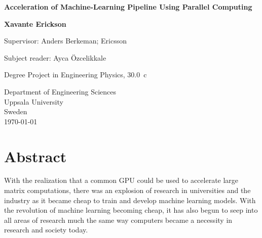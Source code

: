 \documentclass[12pt, a4paper]{article}
\title{}
\author{Lowe Erickson }
\date{May 2018}
\begin{document}
\begin{titlepage}
   \begin{center}
        \vspace*{1cm}
        \Huge
        \textbf{Acceleration of
        Machine-Learning Pipeline Using Parallel Computing}
 
        \LARGE
        \vspace{1cm}
       
        \textbf{Xavante Erickson}
 
        \vfill
        
        Supervisor: Anders Berkeman; Ericsson

        \vspace{0.5cm}
        
        Subject reader: Ayca Özcelikkale
        
        \vspace{0.5cm}

        Degree Project in Engineering Physics, \SI{30.0}{c}
 
        \vspace{0.8cm}
 
 
        Department of Engineering Sciences\\
        \vspace{0.2cm}
        Uppsala University\\
        \vspace{0.2cm}
        Sweden\\
        \vspace{0.2cm}
        \today
   \end{center}
\end{titlepage}



\section*{Abstract}
With the realization that a common GPU could be used to accelerate large matrix computations, there was an explosion of research in universities and the industry as it became cheap to train and develop machine learning models.
With the revolution of machine learning becoming cheap, it has also begun to seep into all areas of research much the same way computers became a necessity in research and society today. \par
\end{document}
